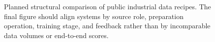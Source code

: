 \begin{figure}[t]
\centering
\fbox{\rule{0pt}{6.4cm}\rule{0.96\textwidth}{0pt}}
\caption{Planned structural comparison of public industrial data recipes. The final figure should align systems by source role, preparation operation, training stage, and feedback rather than by incomparable data volumes or end-to-end scores.}
\label{fig:industrial-recipe-map}
\end{figure}
